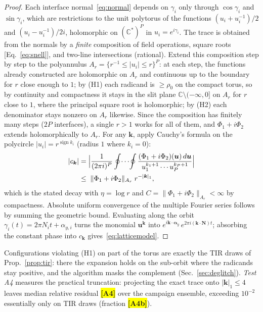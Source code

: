 \documentclass[twocolumn,preprintnumbers,amsmath,amssymb,pra,floatfix]{revtex4-2}
\newcommand{\vect}[1]{\bm{#1}}
\newcommand{\PH}[1]{\colorbox{yellow}{\textbf{\small [#1]}}}
\begin{document}
\begin{proof}
Each interface normal~\eqref{eq:normal} depends on $\gamma_i$ only
through $\cos\gamma_i$ and $\sin\gamma_i$, which are restrictions to
the unit polytorus of the functions $(u_i+u_i^{-1})/2$ and
$(u_i-u_i^{-1})/2i$, holomorphic on $(\mathbb{C}^{*})^{P}$ in
$u_i=e^{i\gamma_i}$.  The trace is obtained from the normals by a
\emph{finite} composition of field operations, square roots
[Eq.~\eqref{eq:snell}], and two-line intersections (rational).
Extend this composition step by step to the polyannulus
$A_{r}=\{r^{-1}\le|u_i|\le r\}^{P}$: at each step, the functions
already constructed are holomorphic on $A_{r}$ and continuous up to
the boundary for $r$ close enough to $1$; by (H1) each radicand is
$\ge\rho_0$ on the compact torus, so by continuity and compactness it
stays in the slit plane $\mathbb{C}\setminus(-\infty,0]$ on $A_{r}$
for $r$ close to $1$, where the principal square root is holomorphic;
by (H2) each denominator stays nonzero on $A_{r}$ likewise.  Since
the composition has finitely many steps ($2P$ interfaces), a single
$r>1$ works for all of them, and $\Phi_1+i\Phi_2$ extends
holomorphically to $A_{r}$.  For any $\vect{k}$, apply Cauchy's
formula on the polycircle $|u_i|=r^{\operatorname{sign}k_i}$
(radius $1$ where $k_i=0$):
\begin{align*}
  |c_{\vect{k}}|
  &=\Bigl|\frac{1}{(2\pi i)^{P}}\oint\!\cdots\!\oint
  \frac{(\Phi_1+i\Phi_2)(\vect{u})\,d\vect{u}}
        {u_1^{k_1+1}\cdots u_P^{k_P+1}}\Bigr|\\
  &\le\;\|\Phi_1+i\Phi_2\|_{A_r}\;r^{-|\vect{k}|_1},
\end{align*}
which is the stated decay with $\eta=\log r$ and
$C=\|\Phi_1+i\Phi_2\|_{A_r}<\infty$ by compactness.  Absolute uniform
convergence of the multiple Fourier series follows by summing the
geometric bound.  Evaluating along the orbit
$\gamma_i(t)=2\pi N_it+\alpha_{y,i}$ turns the monomial
$\vect{u}^{\vect{k}}$ into
$e^{i\vect{k}\cdot\vect{\alpha}_y}\,
e^{2\pi i(\vect{k}\cdot\vect{N})t}$; absorbing the constant phase
into $c_{\vect{k}}$ gives~\eqref{eq:latticemodel}.
\end{proof}

Configurations violating (H1) on part of the torus are exactly the
TIR draws of Prop.~\ref{prop:tir}: there the expansion holds on the
sub-orbit where the radicands stay positive, and the algorithm masks
the complement (Sec.~\ref{sec:deglitch}).  \emph{Test A4} measures
the practical truncation: projecting the exact trace onto
$|\vect{k}|_1\le4$ leaves median relative residual \PH{A4} over the
campaign ensemble, exceeding $10^{-2}$ essentially only on TIR draws
(fraction \PH{A4b}).
\end{document}
